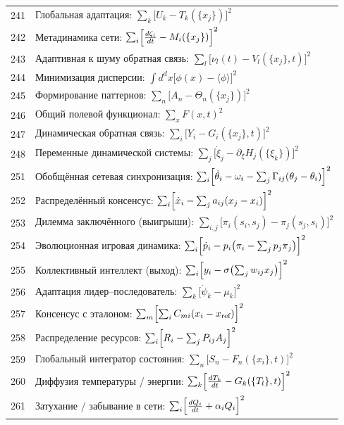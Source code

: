 \documentclass[12pt,a4paper]{article}
\begin{document}
\begin{longtable}{r l}
		241 & Глобальная адаптация: $\sum_k\bigl[U_k - T_k(\{x_j\})\bigr]^2$ \\
		242 & Метадинамика сети: $\sum_i\Bigl[\frac{d\zeta_i}{dt} - M_i(\{x_j\})\Bigr]^2$ \\
		243 & Адаптивная к шуму обратная связь: $\sum_l\bigl[\nu_l(t) - V_l(\{x_j\},t)\bigr]^2$ \\
		244 & Минимизация дисперсии: $\int d^dx\bigl[\phi(x) - \langle\phi\rangle\bigr]^2$ \\
		245 & Формирование паттернов: $\sum_n\bigl[A_n - \Theta_n(\{x_j\})\bigr]^2$ \\
		246 & Общий полевой функционал: $\sum_x F(x,t)^2$ \\
		247 & Динамическая обратная связь: $\sum_i\bigl[Y_i - G_i(\{x_j\},t)\bigr]^2$ \\
		248 & Переменные динамической системы: $\sum_j\bigl[\dot\xi_j - \partial_\xi H_j(\{\xi_k\})\bigr]^2$ \\
		251 & Обобщённая сетевая синхронизация: $\sum_i\Bigl[\dot\theta_i - \omega_i - \sum_j\Gamma_{ij}(\theta_j-\theta_i)\Bigr]^2$ \\
		252 & Распределённый консенсус: $\sum_i\Bigl[\dot x_i - \sum_j a_{ij}(x_j-x_i)\Bigr]^2$ \\
		253 & Дилемма заключённого (выигрыши): $\sum_{i,j}\bigl[\pi_i(s_i,s_j) - \pi_j(s_j,s_i)\bigr]^2$ \\
		254 & Эволюционная игровая динамика: $\sum_i\Bigl[\dot p_i - p_i\bigl(\pi_i - \sum_j p_j\pi_j\bigr)\Bigr]^2$ \\
		255 & Коллективный интеллект (выход): $\sum_i\Bigl[y_i - \sigma\bigl(\sum_j w_{ij}x_j\bigr)\Bigr]^2$ \\
		256 & Адаптация лидер–последователь: $\sum_k\bigl[\dot\psi_k - \mu_k\bigr]^2$ \\
		257 & Консенсус с эталоном: $\sum_m\Bigl[\sum_i C_{mi}(x_i-x_{\text{ref}})\Bigr]^2$ \\
		258 & Распределение ресурсов: $\sum_i\Bigl[R_i - \sum_j P_{ij}A_j\Bigr]^2$ \\
		259 & Глобальный интегратор состояния: $\sum_n\bigl[S_n - F_n(\{x_i\},t)\bigr]^2$ \\
		260 & Диффузия температуры / энергии: $\sum_k\Bigl[\frac{dT_k}{dt} - G_k(\{T_l\},t)\Bigr]^2$ \\
		261 & Затухание / забывание в сети: $\sum_i\Bigl[\frac{dQ_i}{dt} + \alpha_i Q_i\Bigr]^2$ \\

\end{longtable}
\end{document}
